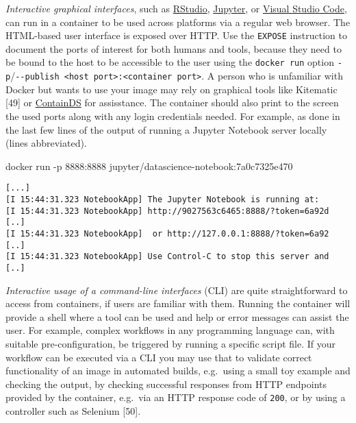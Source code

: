 \documentclass[10pt,letterpaper]{article}
\newenvironment{Shaded}{\begin{snugshade}}{\end{snugshade}}
\newcommand{\ExtensionTok}[1]{#1}
\newcommand{\NormalTok}[1]{#1}
\begin{document}
\emph{Interactive graphical interfaces}, such as
\href{https://rstudio.com/products/rstudio/}{RStudio},
\href{https://jupyter.org/}{Jupyter}, or
\href{https://code.visualstudio.com/}{Visual Studio Code}, can run in a
container to be used across platforms via a regular web browser. The
HTML-based user interface is exposed over HTTP. Use the \texttt{EXPOSE}
instruction to document the ports of interest for both humans and tools,
because they need to be bound to the host to be accessible to the user
using the \texttt{docker\ run} option
\texttt{-p}/\texttt{-\/-publish\ \textless{}host\ port\textgreater{}:\textless{}container\ port\textgreater{}}.
A person who is unfamiliar with Docker but wants to use your image may
rely on graphical tools like Kitematic {[}49{]} or
\href{https://containds.com/}{ContainDS} for assisstance. The container
should also print to the screen the used ports along with any login
credentials needed. For example, as done in the last few lines of the
output of running a Jupyter Notebook server locally (lines abbreviated).

\begin{Shaded}
\begin{Highlighting}[]
\ExtensionTok{docker}\NormalTok{ run -p 8888:8888 jupyter/datascience-notebook:7a0c7325e470}
\end{Highlighting}
\end{Shaded}

\begin{verbatim}
[...]
[I 15:44:31.323 NotebookApp] The Jupyter Notebook is running at:
[I 15:44:31.323 NotebookApp] http://9027563c6465:8888/?token=6a92d [..]
[I 15:44:31.323 NotebookApp]  or http://127.0.0.1:8888/?token=6a92 [..]
[I 15:44:31.323 NotebookApp] Use Control-C to stop this server and [..]
\end{verbatim}

\emph{Interactive usage of a command-line interfaces} (CLI) are quite
straightforward to access from containers, if users are familiar with
them. Running the container will provide a shell where a tool can be
used and help or error messages can assist the user. For example,
complex workflows in any programming language can, with suitable
pre-configuration, be triggered by running a specific script file. If
your workflow can be executed via a CLI you may use that to validate
correct functionality of an image in automated builds, e.g.~using a
small toy example and checking the output, by checking successful
responses from HTTP endpoints provided by the container, e.g.~via an
HTTP response code of \texttt{200}, or by using a controller such as
Selenium {[}50{]}.
\end{document}
